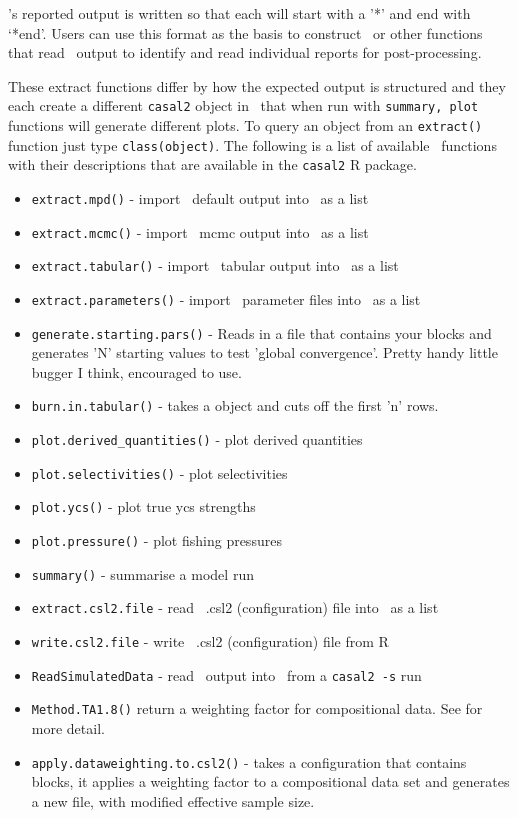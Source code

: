 \CNAME's reported output is written so that each  will start with a '*' and end with `*end'. Users can use this format as the basis to construct \R\ or other functions that read \CNAME\ output to identify and read individual reports for post-processing.


These extract functions differ by how the expected output is structured and they each create a different \texttt{casal2} object in \R\ that when run with \texttt{summary, plot} functions will generate different plots. To query an object from an \texttt{extract()} function just type \texttt{class(object)}. The following is a list of available \R\ functions with their descriptions that are available in the \texttt{casal2} R package.

\begin{itemize}
	\item \texttt{extract.mpd()} - import \CNAME\ default output into \R\ as a list
	\item \texttt{extract.mcmc()} - import \CNAME\ mcmc output into \R\ as a list
	\item \texttt{extract.tabular()} - import \CNAME\ tabular output into \R\ as a list
	\item \texttt{extract.parameters()} - import \CNAME\ parameter files into \R\ as a list
	\item \texttt{generate.starting.pars()} - Reads in a file that contains your  blocks and generates 'N' starting values to test 'global convergence'. Pretty handy little bugger I think, encouraged to use.	
	\item \texttt{burn.in.tabular()} - takes a  object and cuts off the first 'n' rows.
	\item \texttt{plot.derived\_quantities()} - plot derived quantities
	\item \texttt{plot.selectivities()} - plot selectivities
	\item \texttt{plot.ycs()} - plot true ycs strengths
	\item \texttt{plot.pressure()} - plot fishing pressures		
	\item \texttt{summary()} - summarise a model run	
	\item \texttt{extract.csl2.file} - read \CNAME\ .csl2 (configuration) file into \R\ as a list
	\item \texttt{write.csl2.file} - write \CNAME\ .csl2 (configuration) file from R
	\item \texttt{ReadSimulatedData} - read \CNAME\ output into \R\ from a \texttt{casal2 -s} run		
	\item \texttt{Method.TA1.8()} return a weighting factor for compositional data. See \cite{francis2011data} for more detail.
	\item \texttt{apply.dataweighting.to.csl2()} - takes a configuration that contains  blocks, it applies a weighting factor to a compositional data set and generates a new  file, with modified effective sample size.
	
\end{itemize}

